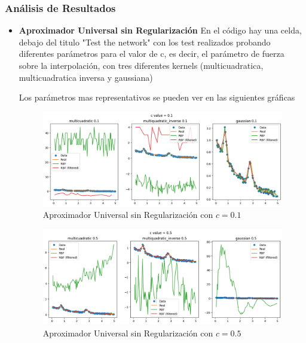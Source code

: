 \documentclass{article}
\theoremstyle{mytheoremstyle}
\theoremstyle{mytheoremstyle}
\theoremstyle{myproblemstyle}
\begin{document}
\subsubsection*{Análisis de Resultados}
\begin{itemize}
  \item \textbf{Aproximador Universal sin Regularización}
        En el código hay una celda, debajo del titulo "Test the network" con los test realizados probando diferentes parámetros para el valor de c, es decir, el parámetro de fuerza sobre la interpolación, con tres diferentes kernels (multicuadratica, multicuadratica inversa y gaussiana)

        Los parámetros mas representativos se pueden ver en las siguientes gráficas

        \begin{figure}[!ht]
          \centering
          \includegraphics[width=1\textwidth]{./imgs/AU/au1.png}
          \caption{Aproximador Universal sin Regularización con $c=0.1$}
          \label{fig:1}
        \end{figure}

        \begin{figure}[!ht]
          \centering
          \includegraphics[width=1\textwidth]{./imgs/AU/au2.png}
          \caption{Aproximador Universal sin Regularización con $c=0.5$}
          \label{fig:2}
        \end{figure}


\end{itemize}
\end{document}
